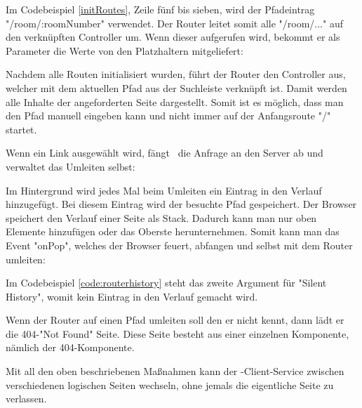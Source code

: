Im Codebeispiel \ref{initRoutes}, Zeile fünf bis sieben, wird der Pfadeintrag "{\ttfamily /room/:roomNumber}" verwendet. Der Router leitet somit alle "{\ttfamily /room/...}" auf den verknüpften Controller um. Wenn dieser aufgerufen wird, bekommt er als Parameter die Werte von den Platzhaltern mitgeliefert:


Nachdem alle Routen initialisiert wurden, führt der Router den Controller aus, welcher mit dem aktuellen Pfad aus der Suchleiste verknüpft ist. Damit werden alle  Inhalte der angeforderten Seite dargestellt. Somit ist es möglich, dass man den Pfad manuell eingeben kann und nicht immer auf der Anfangsroute "{\ttfamily /}" startet.

Wenn ein Link ausgewählt wird, fängt \ZELIA\ die Anfrage an den Server ab und verwaltet das Umleiten selbst:


Im  Hintergrund wird jedes Mal beim Umleiten ein Eintrag in den Verlauf hinzugefügt. Bei diesem Eintrag wird der besuchte Pfad gespeichert. Der Browser speichert den Verlauf einer Seite als Stack. Dadurch kann man nur oben Elemente hinzufügen oder das Oberste herunternehmen. Somit kann man das Event "onPop", welches der Browser feuert, abfangen und selbst mit dem Router umleiten:


Im Codebeispiel \ref{code:routerhistory} steht das zweite Argument für "Silent History", womit kein Eintrag in den Verlauf gemacht wird.

Wenn der Router auf einen Pfad umleiten soll den er nicht kennt, dann lädt er die 404-"Not Found" Seite. Diese Seite besteht aus einer einzelnen Komponente, nämlich der 404-Komponente.


Mit all den oben beschriebenen Maßnahmen kann der \ZELIA-Client-Service zwischen verschiedenen logischen Seiten wechseln, ohne jemals die eigentliche Seite zu verlassen.
